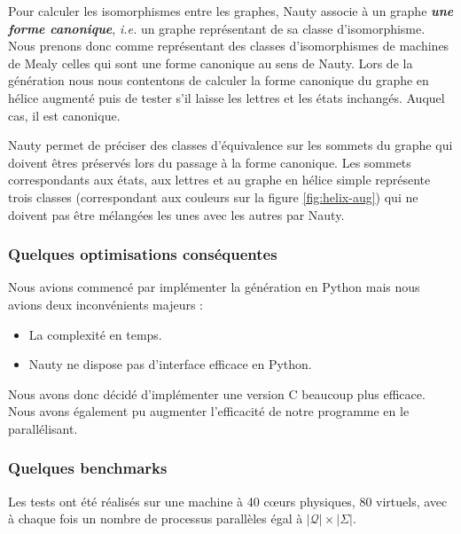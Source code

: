 \documentclass[11pt,a4paper]{article}
\begin{document}
Pour calculer les isomorphismes entre les graphes, \textrm{Nauty} associe à un graphe \textit{\textbf{une forme canonique}}, \emph{i.e.} un graphe représentant de sa classe d'isomorphisme. Nous prenons donc comme représentant des classes d'isomorphismes de machines de Mealy celles qui sont une forme canonique au sens de \textrm{Nauty}. Lors de la génération nous nous contentons de calculer la forme canonique du graphe en hélice augmenté puis de tester s'il laisse les lettres et les états inchangés. Auquel cas, il est canonique.

Nauty permet de préciser des classes d'équivalence sur les sommets du graphe qui doivent êtres préservés lors du passage à la forme canonique. Les sommets correspondants aux états, aux lettres et au graphe en hélice simple représente trois classes (correspondant aux couleurs sur la figure \ref{fig:helix-aug}) qui ne doivent pas être mélangées les unes avec les autres par \textrm{Nauty}.

\subsubsection*{Quelques optimisations conséquentes}
Nous avions commencé par implémenter la génération en \textrm{Python} mais nous avions deux inconvénients majeurs :
\begin{itemize}
\item La complexité en temps.
\item \textrm{Nauty} ne dispose pas d'interface efficace en Python.
\end{itemize}

Nous avons donc décidé d'implémenter une version C beaucoup plus efficace. Nous avons également pu augmenter l'efficacité de notre programme en le parallélisant.

\subsubsection*{Quelques benchmarks}

Les tests ont été réalisés sur une machine à 40 cœurs physiques, 80 virtuels, avec à chaque fois un nombre de processus parallèles égal à $|\mathcal{Q}|\times|\Sigma|$.
\end{document}
